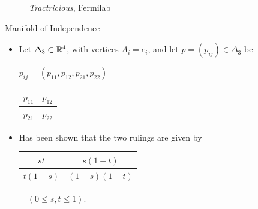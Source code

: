 \begin{frame}
\begin{figure}[!htb]
\begin{minipage}{.3\textwidth}
        \caption{\emph{Tractricious}, Fermilab}
    \end{minipage}
    \end{figure}

\end{frame}

\begin{frame}{Manifold of Independence}

    \begin{itemize}
        \item Let $\Delta_{3} \subset \mathbb{R}^{4}$, with vertices $A_{i} = e_{i}$, and let $p = (p_{ij}) \in \Delta_{3}$ be
        \vspace{-6pt}
        \begin{center}
        \begin{table}[]
        $p_{ij} = (p_{11}, p_{12}, p_{21}, p_{22}) =$ 
        \begin{tabular}{|l|l|}
        \hline
        $p_{11}$ & $p_{12}$ \\ \hline
        $p_{21}$ & $p_{22}$ \\ \hline
        \end{tabular}
        \end{table}
        \end{center}

    \item Has been shown that the two rulings are given by
    
    \begin{center}
    \begin{table}[]
    \begin{tabular}{|c|c|}
    \hline
    $st$ & $s(1-t)$ \\ \hline
    $t(1-s)$ & $(1-s)(1-t)$ \\ \hline
    \end{tabular}
    $\quad (0 \leq s,t \leq 1).$
    \end{table}
    \end{center}
    
    \end{itemize}


\end{frame}
